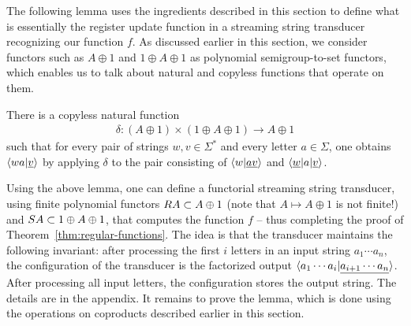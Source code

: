 The following lemma uses the ingredients described in this section to define what is essentially the register update function in a streaming string transducer recognizing our function $f$.  As discussed earlier in this section, we consider functors such as $A \oplus 1$ and $1 \oplus A \oplus 1$ as polynomial semigroup-to-set functors, which enables us to talk about natural and copyless functions that operate on them.
\begin{lemma}\label{lem:compute-next-configuration}
    There is a {copyless} natural function
    \begin{align*}
    \delta\colon (A \oplus 1) \times (1 \oplus A \oplus 1) \to A \oplus 1
    \end{align*} 
    such that for every pair of strings $w,v \in \Sigma^*$ and every letter $a \in \Sigma$, one obtains $\langle wa|\underline v \rangle$ by applying $\delta$ to the pair  consisting of  $\langle w|\underline {av} \rangle$ and $\langle \underline w | a|\underline v \rangle$.
    \end{lemma}

    Using the above lemma, one can define a functorial streaming string transducer, using finite polynomial functors $\functorr A \subset A \oplus 1$ (note that $A \mapsto A \oplus 1$ is not finite!) and $\functors A \subset 1 \oplus A \oplus 1$, that computes the function $f$ -- thus completing the proof of Theorem~\ref{thm:regular-functions}. The idea is that the transducer maintains the following invariant: after processing the first $i$ letters in an input string $a_1 \cdots a_n$, the configuration of the transducer is the factorized output $\langle a_1 \cdots a_i | \underline{a_{i+1} \cdots a_n} \rangle$. After processing all input letters, the configuration stores the output string. The details are in the appendix. It remains to prove the lemma, which is done using the operations on coproducts described earlier in this section. 

